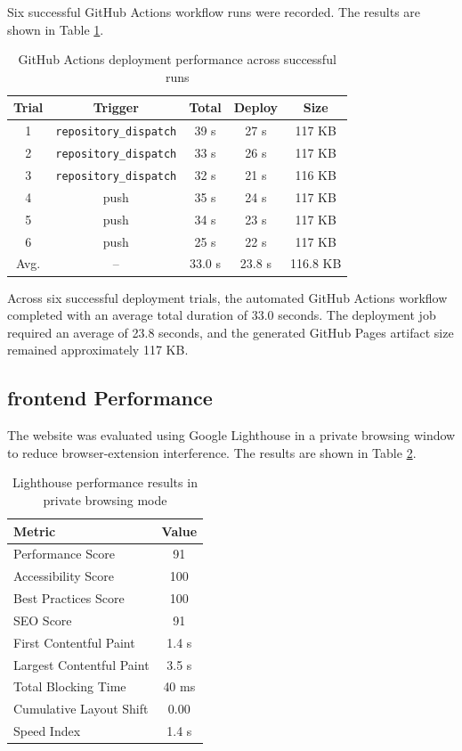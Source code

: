 \documentclass[10pt,a4paper,twocolumn]{article}
\begin{document}
Six successful GitHub Actions workflow runs were recorded. The results are shown in Table \ref{tab:deployment-performance}.

\begin{table}[H]
\centering
\caption{GitHub Actions deployment performance across successful runs}
\label{tab:deployment-performance}
\scriptsize
\begin{tabular}{ccccc}
\toprule
Trial & Trigger & Total & Deploy & Size\\
\midrule
1 & \texttt{repository\_dispatch} & 39 s & 27 s & 117 KB\\
2 & \texttt{repository\_dispatch} & 33 s & 26 s & 117 KB\\
3 & \texttt{repository\_dispatch} & 32 s & 21 s & 116 KB\\
4 & push & 35 s & 24 s & 117 KB\\
5 & push & 34 s & 23 s & 117 KB\\
6 & push & 25 s & 22 s & 117 KB\\
\midrule
Avg. & -- & 33.0 s & 23.8 s & 116.8 KB\\
\bottomrule
\end{tabular}
\end{table}

Across six successful deployment trials, the automated GitHub Actions workflow completed with an average total duration of 33.0 seconds. The deployment job required an average of 23.8 seconds, and the generated GitHub Pages artifact size remained approximately 117 KB.

\subsection{frontend Performance}

The website was evaluated using Google Lighthouse in a private browsing window to reduce browser-extension interference. The results are shown in Table \ref{tab:lighthouse-results}.

\begin{table}[H]
\centering
\caption{Lighthouse performance results in private browsing mode}
\label{tab:lighthouse-results}
\small
\begin{tabular}{lc}
\toprule
Metric & Value\\
\midrule
Performance Score & 91\\
Accessibility Score & 100\\
Best Practices Score & 100\\
SEO Score & 91\\
First Contentful Paint & 1.4 s\\
Largest Contentful Paint & 3.5 s\\
Total Blocking Time & 40 ms\\
Cumulative Layout Shift & 0.00\\
Speed Index & 1.4 s\\
\bottomrule
\end{tabular}
\end{table}
\end{document}

